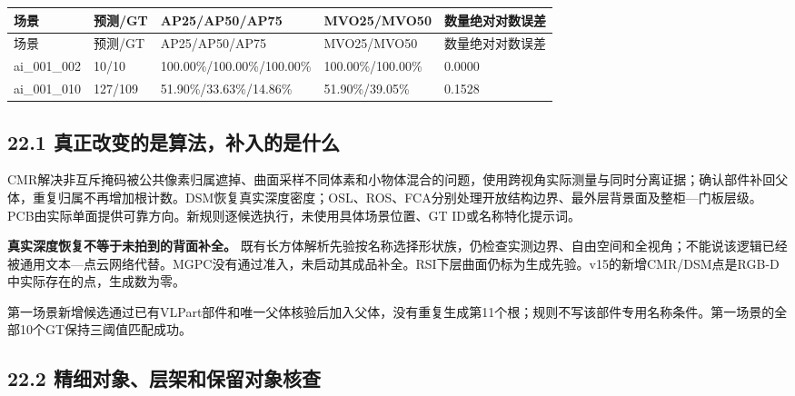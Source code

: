 \documentclass[UTF8,fontset=fandol]{ctexart}
\begin{document}
{\small
\begin{longtable}{|p{}|p{}|p{}|p{}|p{}|}
\hline
场景 & 预测/GT & AP25/AP50/AP75 & MVO25/MVO50 & 数量绝对对数误差 \\ \hline
\endfirsthead
\hline
场景 & 预测/GT & AP25/AP50/AP75 & MVO25/MVO50 & 数量绝对对数误差 \\ \hline
\endhead
ai\_001\_002 & 10/10 & 100.00\%/100.00\%/100.00\% & 100.00\%/100.00\% & 0.0000 \\ \hline
ai\_001\_010 & 127/109 & 51.90\%/33.63\%/14.86\% & 51.90\%/39.05\% & 0.1528 \\ \hline
\end{longtable}
}

\subsection*{22.1 真正改变的是算法，补入的是什么}

CMR解决非互斥掩码被公共像素归属遮掉、曲面采样不同体素和小物体混合的问题，使用跨视角实际测量与同时分离证据；确认部件补回父体，重复归属不再增加根计数。DSM恢复真实深度密度；OSL、ROS、FCA分别处理开放结构边界、最外层背景面及整柜—门板层级。PCB由实际单面提供可靠方向。新规则逐候选执行，未使用具体场景位置、GT ID或名称特化提示词。



\textbf{真实深度恢复不等于未拍到的背面补全。} 既有长方体解析先验按名称选择形状族，仍检查实测边界、自由空间和全视角；不能说该逻辑已经被通用文本—点云网络代替。MGPC没有通过准入，未启动其成品补全。RSI下层曲面仍标为生成先验。v15的新增CMR/DSM点是RGB-D中实际存在的点，生成数为零。



第一场景新增候选通过已有VLPart部件和唯一父体核验后加入父体，没有重复生成第11个根；规则不写该部件专用名称条件。第一场景的全部10个GT保持三阈值匹配成功。



\subsection*{22.2 精细对象、层架和保留对象核查}
\end{document}
